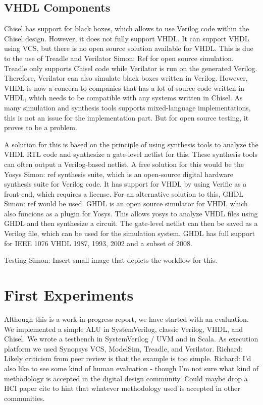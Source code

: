 \documentclass[a4paper, conference]{IEEEtran}
\newcommand{\simon}[1]{{\color{green} Simon: #1}}
\newcommand{\ducky}[1]{{\color{orange} Richard: #1}}
\begin{document}
\subsection{VHDL Components}

Chisel has support for black boxes, which allows to use Verilog code within the Chisel design. However, it does not fully support VHDL. It can support VHDL using VCS, but there is no open source solution available for VHDL. This is due to the use of Treadle and Verilator \simon{Ref} for open source simulation. Treadle only supports Chisel code while Verilator is run on the generated Verilog. Therefore, Verilator can also simulate black boxes written in Verilog. However, VHDL is now a concern to companies that has a lot of source code written in VHDL, which needs to be compatible with any systems written in Chisel. As many simulation and synthesis tools supports mixed-language implementations, this is not an issue for the implementation part. But for open source testing, it proves to be a problem.

A solution for this is based on the principle of using synthesis tools to analyze the VHDL RTL code and synthesize a gate-level netlist for this. These synthesis tools can often output a Verilog-based netlist. A free solution for this would be the Yosys \simon{ref} synthesis suite, which is an open-source digital hardware synthesis suite for Verilog code. It has support for VHDL by using Verific as a front-end, which requires a license. For an alternative solution to this, GHDL \simon{ref} would be used. GHDL is an open source simulator for VHDL which also funcions as a plugin for Yosys. This allows yosys to analyze VHDL files using GHDL and then synthesize a circuit. The gate-level netlist can then be saved as a Verilog file, which can be used for the simulation system. GHDL has full support for IEEE 1076 VHDL 1987, 1993, 2002 and a subset of 2008.

Testing
\simon{Insert small image that depicts the workflow for this.}

\section{First Experiments}

Although this is a work-in-progress report, we have started with an evaluation.
We implemented a simple ALU in SystemVerilog, classic Verilog, VHDL, and Chisel.
We wrote a testbench in SystemVerilog / UVM and in Scala. As execution platform we
used Synopsys VCS, ModelSim, Treadle, and Verilator.
\ducky{Likely criticism from peer review is that the example is too simple.}
\ducky{I'd also like to see some kind of human evaluation - though I'm not sure what kind of methodology is accepted in the digital design community. Could maybe drop a HCI paper cite to hint that whatever methodology used is accepted in other communities.}
\end{document}
